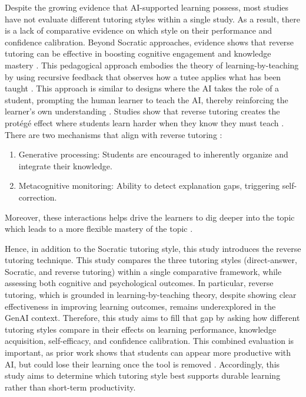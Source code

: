 \documentclass{article}
\begin{document}
Despite the growing evidence that AI-supported learning possess, most studies 
have not evaluate different tutoring styles within a single study. 
As a result, there is a lack of comparative evidence on which style on their 
performance and confidence calibration. 
Beyond Socratic approaches, evidence shows that reverse tutoring 
can be effective in boosting cognitive engagement and knowledge mastery \cite{Okita2013,Fiorella2023,Lyu2025,Wong2026}.
This pedagogical approach embodies the theory of 
learning-by-teaching by using recursive feedback that 
observes how a tutee applies what has been taught \cite{Okita2013}. 
This approach is similar to designs where the AI takes the role of a student, 
prompting the human learner to teach the AI, 
thereby reinforcing the learner’s own understanding \cite{Mollick2023}.
Studies show that reverse tutoring creates the protégé effect 
where students learn harder when they know they must teach \cite{Okita2013,Wong2026}.
There are two mechanisms that align with reverse tutoring \cite{Fiorella2023}:
\begin{enumerate}
    \item Generative processing: Students are encouraged to inherently organize and integrate their knowledge.
    \item Metacognitive monitoring: Ability to detect explanation gaps, triggering self-correction.
\end{enumerate}
Moreover, these interactions helps drive the learners to 
dig deeper into the topic which leads to a more flexible 
mastery of the topic \cite{Fiorella2023,Lyu2025}.

Hence, in addition to the Socratic tutoring style, 
this study introduces the reverse tutoring technique. 
This study compares the three tutoring styles (direct-answer, Socratic, and reverse tutoring) 
within a single comparative framework, 
while assessing both cognitive and psychological outcomes. 
In particular, reverse tutoring, which is grounded in learning-by-teaching theory, 
despite showing clear effectiveness in improving learning outcomes, 
remains underexplored in the GenAI context.
Therefore, this study aims to fill that gap by asking how different tutoring styles compare in their 
effects on learning performance, knowledge acquisition, self-efficacy, 
and confidence calibration. This combined evaluation is important, as 
prior work shows that students can appear more productive 
with AI, but could lose their learning once the tool is removed \cite{Wang2024,Bastani2025}.
Accordingly, this study aims to determine which tutoring style best supports durable 
learning rather than short-term productivity.
\end{document}

